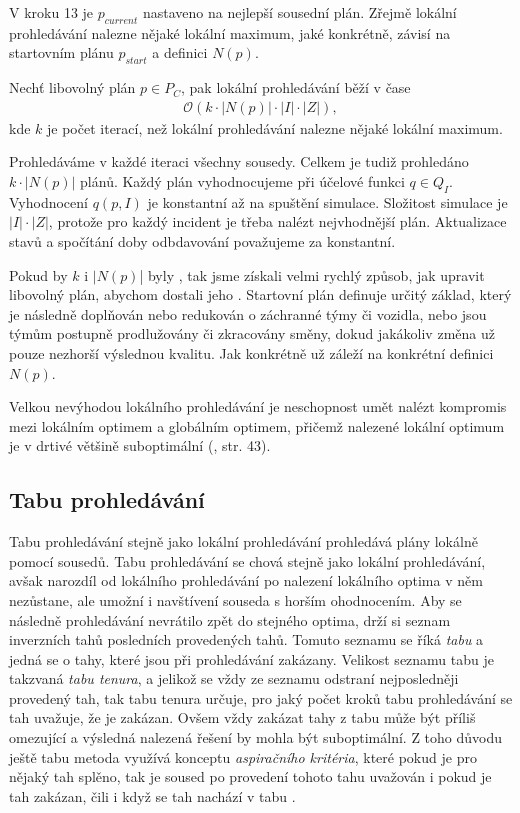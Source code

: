 V kroku 13 je $p_{current}$ nastaveno na nejlepší sousední plán.
Zřejmě lokální prohledávání nalezne nějaké lokální maximum, jaké konkrétně, závisí na startovním plánu $p_{start}$ a definici $N(p)$.

\begin{veta}
  Nechť libovolný plán $p \in P_C$, pak lokální prohledávání běží v čase
  \begin{align*}
    \mathcal{O}(k \cdot |N(p)| \cdot |I| \cdot |Z|),
  \end{align*}
  kde $k$ je počet iterací, než lokální prohledávání nalezne nějaké lokální maximum.
\end{veta}
\begin{dukaz}
  Prohledáváme v každé iteraci všechny sousedy. Celkem je tudiž prohledáno $k \cdot |N(p)|$ plánů.
  Každý plán vyhodnocujeme při účelové funkci $q \in Q_I$. Vyhodnocení $q(p, I)$ je konstantní až na spuštění simulace. 
  Složitost simulace je $|I| \cdot |Z|$, protože pro každý incident je třeba nalézt nejvhodnější plán.
  Aktualizace stavů a spočítání doby odbdavování považujeme za konstantní.
\end{dukaz}

Pokud by $k$ i $|N(p)$| byly , tak jsme získali velmi rychlý způsob, jak upravit libovolný plán, abychom dostali jeho . 
Startovní plán definuje určitý základ, který je následně doplňován nebo redukován o záchranné týmy či vozidla,
nebo jsou týmům postupně prodlužovány či zkracovány směny,
dokud jakákoliv změna už pouze nezhorší výslednou kvalitu. 
Jak konkrétně už záleží na konkrétní definici $N(p)$.

Velkou nevýhodou lokálního prohledávání je neschopnost umět nalézt kompromis mezi lokálním optimem a globálním optimem,
přičemž nalezené lokální optimum je v drtivé většině suboptimální (\citet{GlovKoch03}, str. 43).

\subsection{Tabu prohledávání}\label{kap:tabuSearch}

Tabu prohledávání stejně jako lokální prohledávání prohledává plány lokálně pomocí sousedů.
Tabu prohledávání se chová stejně jako lokální prohledávání, avšak narozdíl od lokálního prohledávání po nalezení lokálního optima v něm nezůstane,
ale umožní i navštívení souseda s horším ohodnocením.
Aby se následně prohledávání nevrátilo zpět do stejného optima,
drží si seznam inverzních tahů posledních provedených tahů. Tomuto seznamu se říká \textit{tabu} a jedná se o tahy, které 
jsou při prohledávání zakázany.
Velikost seznamu tabu je takzvaná \textit{tabu tenura}, a jelikož se vždy ze seznamu odstraní nejposledněji provedený tah,
tak tabu tenura určuje, pro jaký počet kroků tabu prohledávání se tah uvažuje, že je zakázan. 
Ovšem vždy zakázat tahy z tabu může být příliš omezující a výsledná nalezená řešení by mohla být suboptimální.
Z toho důvodu ještě tabu metoda využívá konceptu \textit{aspiračního kritéria}, které pokud je pro nějaký tah splěno,
tak je soused po provedení tohoto tahu uvažován i pokud je tah zakázan, čili i když se tah nachází v tabu \cite{tabu}.

